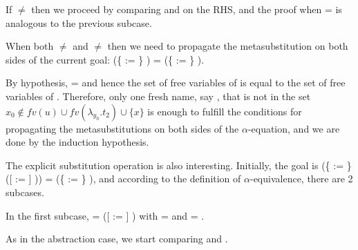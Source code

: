 \begin{coqdoccode}
\end{coqdoccode}
If  \ensuremath{\not=}  then we proceed by comparing  and  on the RHS, and the proof when  =  is analogous to the previous subcase.\begin{coqdoccode}
 \end{coqdoccode}
When both  \ensuremath{\not=}  and  \ensuremath{\not=}  then we need to propagate the metasubstitution on both sides of the current goal: (\{ := \}   ) = (\{ := \}   ).\begin{coqdoccode}
 \end{coqdoccode}
By hypothesis,    =    and hence the set of free variables of    is equal to the set of free variables of   . Therefore, only one fresh name, say , that is not in the set $x_0 \notin fv(u) \cup fv(\lambda_{y_0}.t_2) \cup \{x\}$ is enough to fulfill the conditions for propagating the metasubstitutions on both sides of the $\alpha$-equation, and we are done by the induction hypothesis.\begin{coqdoccode}
 \end{coqdoccode}
The explicit substitution operation is also interesting. Initially, the goal is (\{ := \} ([ := ] )) = (\{ := \} ), and according to the definition of $\alpha$-equivalence, there are 2 subcases.\begin{coqdoccode}
 \end{coqdoccode}
 In the first subcase,  = ([ := ] ) with  =  and  = .
\begin{coqdoccode}
\end{coqdoccode}
As in the abstraction case, we start comparing  and .
\begin{coqdoccode}
\end{coqdoccode}
